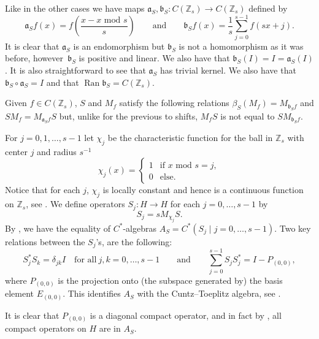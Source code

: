 \documentclass[pdftex]{sigma}
\DeclareMathOperator\Ran{Ran}
\newcommand{\Z}{{\mathbb Z}}
\numberwithin{equation}{section}
\begin{document}
Like in the other cases we have maps $\mathfrak{a}_S,\mathfrak{b}_S\colon C(\Z_s)\to C(\Z_s)$ defined by
\begin{equation*}
\mathfrak{a}_Sf(x) = f\left(\frac{x-x\textrm{ mod }s}{s}\right)\qquad\text{and}\qquad \mathfrak{b}_Sf(x) = \frac{1}{s}\sum_{j=0}^{s-1}f(sx+j) .
\end{equation*}
It is clear that $\mathfrak{a}_S$ is an endomorphism but $\mathfrak{b}_S$ is not a homomorphism as it was before, however~$\mathfrak{b}_S$ is positive and linear. We also have that $\mathfrak{b}_S(I)=I=\mathfrak{a}_S(I)$. It is also straightforward to see that $\mathfrak{a}_S$ has trivial kernel.
We also have that $\mathfrak{b}_S\circ\mathfrak{a}_S=I$ and that $\Ran\mathfrak{b}_S=C(\Z_s)$.

Given $f\in C(\Z_s)$, $S$ and $M_f$ satisfy the following relations
$\beta_S(M_f)=M_{\mathfrak{b}_Sf} $ and $ SM_f=M_{\mathfrak{a}_Sf}S$
but, unlike for the previous to shifts, $M_fS$ is not equal to $SM_{\mathfrak{b}_Sf}$.

For $j=0,1,\dots, s-1$ let $\chi_j$ be the characteristic function for the ball in $\Z_s$ with center $j$ and radius $s^{-1}$
\begin{equation*}
\chi_j(x) =
\begin{cases}
1 &\textrm{if }x \textrm{ mod }s=j, \\
0 &\textrm{else.}
\end{cases}
\end{equation*}
Notice that for each $j$, $\chi_j$ is locally constant and hence is a continuous function on $\Z_s$, see \cite{Ro}. We define operators $S_j\colon H\to H$ for each $j=0,\dots, s-1$ by
\begin{equation}\label{S_j defn}
S_j=sM_{\chi_j}S.
\end{equation}
By \cite[Proposition 6.2]{HKMP3}, we have the equality of $C^*$-algebras
$
A_S=C^*(S_j\mid j=0,\dots,s-1)$.
Two key relations between the $S_j$'s, are the following:
\begin{equation}\label{A_S_cuntz_rel}
S_j^*S_k=\delta_{jk}I\quad \text{for all}\ j,k=0,\dots,s-1 \qquad \text{and}\qquad\sum_{j=0}^{s-1}S_jS_j^*=I-P_{(0,0)} ,
\end{equation}
where $P_{(0,0)}$ is the projection onto (the subspace generated by) the basis element $E_{(0,0)}$. This identifies $A_S$ with the Cuntz--Toeplitz algebra, see \cite{HKMP3}.

It is clear that $P_{(0,0)}$ is a diagonal compact operator, and in fact by \cite[Proposition 6.3]{HKMP3}, all compact operators on $H$ are in $A_S$.
\end{document}

